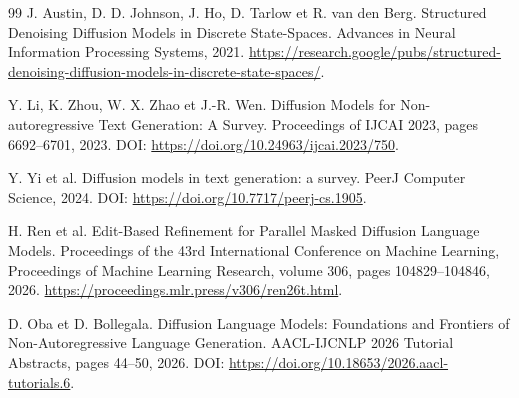 \documentclass[11pt,a4paper,oneside]{report}
\begin{document}
\begin{thebibliography}{99}
J. Austin, D. D. Johnson, J. Ho, D. Tarlow et R. van den Berg.
\newblock Structured Denoising Diffusion Models in Discrete State-Spaces.
\newblock Advances in Neural Information Processing Systems, 2021.
\newblock \url{https://research.google/pubs/structured-denoising-diffusion-models-in-discrete-state-spaces/}.

Y. Li, K. Zhou, W. X. Zhao et J.-R. Wen.
\newblock Diffusion Models for Non-autoregressive Text Generation: A Survey.
\newblock Proceedings of IJCAI 2023, pages 6692--6701, 2023.
\newblock DOI: \url{https://doi.org/10.24963/ijcai.2023/750}.

Y. Yi et al.
\newblock Diffusion models in text generation: a survey.
\newblock PeerJ Computer Science, 2024.
\newblock DOI: \url{https://doi.org/10.7717/peerj-cs.1905}.

H. Ren et al.
\newblock Edit-Based Refinement for Parallel Masked Diffusion Language Models.
\newblock Proceedings of the 43rd International Conference on Machine Learning, Proceedings of Machine Learning Research, volume 306, pages 104829--104846, 2026.
\newblock \url{https://proceedings.mlr.press/v306/ren26t.html}.

D. Oba et D. Bollegala.
\newblock Diffusion Language Models: Foundations and Frontiers of Non-Autoregressive Language Generation.
\newblock AACL-IJCNLP 2026 Tutorial Abstracts, pages 44--50, 2026.
\newblock DOI: \url{https://doi.org/10.18653/2026.aacl-tutorials.6}.
\end{thebibliography}
\end{document}
